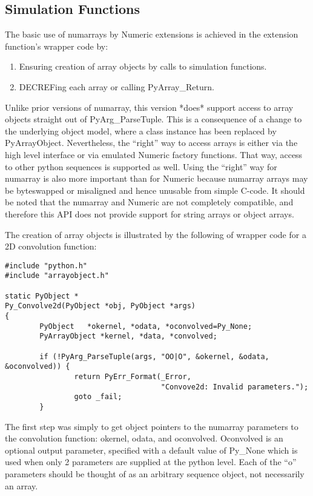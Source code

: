 \subsection{Simulation Functions}
\label{sec:C-API:compat:simulation-functions}

The basic use of numarrays by Numeric extensions is achieved in the extension
function's wrapper code by:
\begin{enumerate}
\item Ensuring creation of array objects by calls to simulation functions.
\item DECREFing each array or calling PyArray_Return.
\end{enumerate}

Unlike prior versions of numarray, this version *does* support access to array
objects straight out of PyArg_ParseTuple.  This is a consequence of a change to
the underlying object model, where a class instance has been replaced by
PyArrayObject.  Nevertheless, the ``right'' way to access arrays is either via
the high level interface or via emulated Numeric factory functions.  That way,
access to other python sequences is supported as well.  Using the ``right'' way
for numarray is also more important than for Numeric because numarray arrays
may be byteswapped or misaligned and hence unusable from simple C-code.  It
should be noted that the numarray and Numeric are not completely compatible,
and therefore this API does not provide support for string arrays or object
arrays.

The creation of array objects is illustrated by the following of wrapper code
for a 2D convolution function:

\begin{verbatim}
#include "python.h"
#include "arrayobject.h"

static PyObject *
Py_Convolve2d(PyObject *obj, PyObject *args)
{
        PyObject   *okernel, *odata, *oconvolved=Py_None;
        PyArrayObject *kernel, *data, *convolved;

        if (!PyArg_ParseTuple(args, "OO|O", &okernel, &odata, &oconvolved)) {
                return PyErr_Format(_Error, 
                                    "Convove2d: Invalid parameters.");  
                goto _fail;
        }
\end{verbatim}

The first step was simply to get object pointers to the numarray parameters to
the convolution function: okernel, odata, and oconvolved.  Oconvolved is an
optional output parameter, specified with a default value of Py_None which is
used when only 2 parameters are supplied at the python level.  Each of the
``o'' parameters should be thought of as an arbitrary sequence object, not
necessarily an array.

